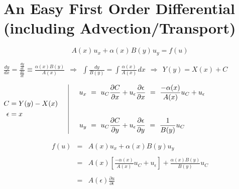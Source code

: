 \documentclass[12pt]{article}
\newcommand{\hs}{\hspace{1pt}}
\begin{document}
\section{An Easy First Order Differential {\small(including Advection/Transport)}}

\vspace{5pt}
\boldmath \[A(x)\hs u_x + \alpha(x)\hs B(y)\hs u_y = f(u)\] \unboldmath

\vspace{20pt}
\(\displaystyle 
	\frac{dy}{dx} = \frac{ \frac{dy}{dt} }{ \frac{dx}{dt} } \equiv \frac{\alpha(x) B(y)}{A(x)}\ 
	\ \Rightarrow\ 
	\ \int \frac{dy}{B(y)} = \int \frac{\alpha(x)}{A(x)}\hs dx \ \ \Rightarrow\ \ Y(y) = X(x) + C 
\)

\vspace{30pt} \noindent
\(
	\begin{aligned}
		C &= Y(y)-X(x) \\
		\epsilon &= x \\
	\end{aligned}
	\hspace{15pt} \vline \hspace{15pt}
	\begin{aligned}
		u_x &\ =\ u_C\displaystyle \frac{\partial C}{\partial x} 
			+ u_{\epsilon}\frac{\partial \epsilon}{\partial x}
			\ =\ \frac{-\alpha(x)}{A(x)} u_C 
			+ u_{\epsilon}
			\\[20pt]
		u_y &\ =\ u_C\displaystyle \frac{\partial C}{\partial y}
			+ u_{\epsilon}\frac{\partial \epsilon}{\partial y}
			\ =\ \frac{1}{B(y)} u_C
	\end{aligned}
\)

\vspace{20pt}
\begin{eqnarray*}
	f(u) &=& A(x) u_x + \alpha(x) B(y) u_y \\ \\
	&=& A(x) \left[ \frac{ -\alpha(x) }{ A(x) } u_C + u_{\epsilon} \right] 
		+ \frac{ \alpha(x) B(y) }{ B(y) } u_C 
		\\ \\
	&=& A(\epsilon) \frac{\partial u}{\partial \epsilon} \\ \\
\end{eqnarray*}
\end{document}
